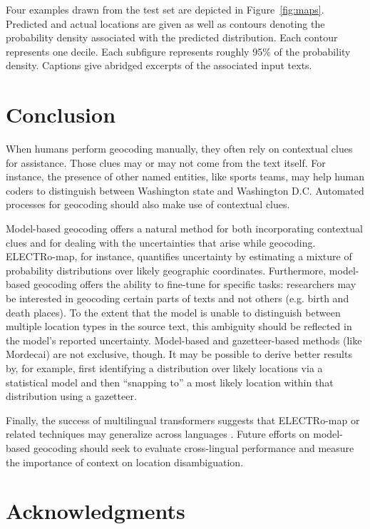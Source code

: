 \documentclass[11pt,a4paper]{article}
\begin{document}
Four examples drawn from the test set are depicted in Figure~\ref{fig:maps}. Predicted and actual locations are given as well as contours denoting the probability density associated with the predicted distribution. Each contour represents one decile. Each subfigure represents roughly 95\% of the probability density. Captions give abridged excerpts of the associated input texts.

\section{Conclusion}

When humans perform geocoding manually, they often rely on contextual clues for assistance. Those clues may or may not come from the text itself. For instance, the presence of other named entities, like sports teams, may help human coders to distinguish between Washington state and Washington D.C. Automated processes for geocoding should also make use of contextual clues.

Model-based geocoding offers a natural method for both incorporating contextual clues and for dealing with the uncertainties that arise while geocoding. ELECTRo-map, for instance, quantifies uncertainty by estimating a mixture of probability distributions over likely geographic coordinates. Furthermore, model-based geocoding offers the ability to fine-tune for specific tasks: researchers may be interested in geocoding certain parts of texts and not others (e.g. birth and death places). To the extent that the model is unable to distinguish between multiple location types in the source text, this ambiguity should be reflected in the model's reported uncertainty. Model-based and gazetteer-based methods (like Mordecai) are not exclusive, though. It may be possible to derive better results by, for example, first identifying a distribution over likely locations via a statistical model and then ``snapping to'' a most likely location within that distribution using a gazetteer.

Finally, the success of multilingual transformers suggests that ELECTRo-map or related techniques may generalize across languages \citep{K2020Cross-Lingual}. Future efforts on model-based geocoding should seek to evaluate cross-lingual performance and measure the importance of context on location disambiguation.

\section*{Acknowledgments}
\end{document}
